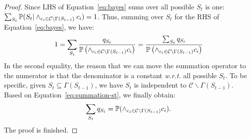 \begin{lemma}
\begin{proof}
Since LHS of Equation~\eqref{eq:bayes} sums over all possible $S_t$ is one: $\sum_{S_t}\mathbb{P}(S_t |\wedge_{c_i \in \mathcal{C}\backslash \Gamma(S_{t-1})}c_i)=1$. Thus, summing over $S_t$ for the RHS of Equation~\eqref{eq:bayes}, we have:
\begin{equation} \label{eq:summation-st} 
\begin{aligned}
1=\sum_{S_t}\frac{q_{S_t} }{\mathbb{P} \left(\wedge_{c_i \in \mathcal{C}\backslash \Gamma(S_{t-1})}c_i\right) }=\frac{\sum_{S_t}q_{S_t} }{\mathbb{P} \left(\wedge_{c_i \in \mathcal{C}\backslash \Gamma(S_{t-1})}c_i\right) }
\end{aligned}
\end{equation}
In the second equality, the reason that we can move the summation operator to  the numerator is that the denominator is a constant \textit{w.r.t.} all possible $S_t$. To be specific, given $S_t\subseteq\Gamma(S_{t-1})$, we have  $S_t$ is independent to $\mathcal{C}\backslash \Gamma(S_{t-1})$.
Based on Equation~\eqref{eq:summation-st}, we finally obtain:
\begin{equation*}
\sum_{S_t}q_{S_t}=\mathbb{P}(\wedge_{c_i \in \mathcal{C}\backslash \Gamma(S_{t-1})}c_i).
\end{equation*}
The proof  is finished. 
\end{proof}
\end{lemma}


